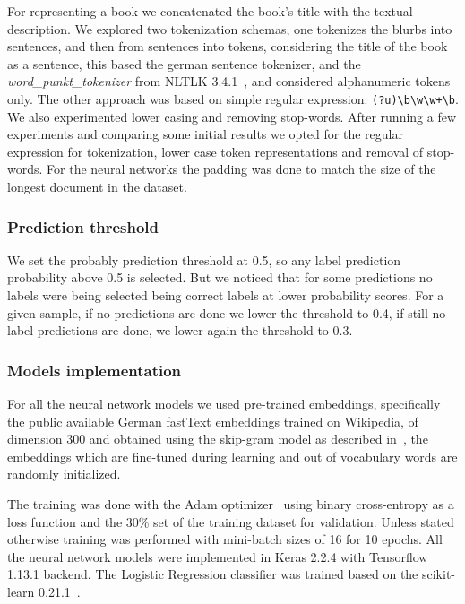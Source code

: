 \documentclass[11pt,a4paper]{article}
\begin{document}
For representing a book we concatenated the book's title with the textual
description. We explored two tokenization schemas, one tokenizes the blurbs into
sentences, and then from sentences into tokens, considering the title of the
book as a sentence, this based the german sentence tokenizer, and the
\textit{word\_punkt\_tokenizer} from NLTLK 3.4.1~\cite{Bird:2009:NLP:1717171},
and considered alphanumeric tokens only. The other approach was based on
simple regular expression: \verb|(?u)\b\w\w+\b|. We also experimented lower casing
and removing stop-words. After running a few experiments and comparing some
initial results we opted for the regular expression for tokenization, lower case
token representations and removal of stop-words. For the neural networks the
padding was done to match the size of the longest document in the dataset.


\subsubsection{Prediction threshold}

We set the probably prediction threshold at 0.5, so any label prediction probability
above 0.5 is selected. But we noticed that for some predictions no labels were
being selected being correct labels at lower probability scores. For a given
sample, if no predictions are done we lower the threshold to 0.4, if
still no label predictions are done, we lower again the threshold to 0.3.



\subsubsection{Models implementation}

For all the neural network models we used pre-trained embeddings, specifically
the public available German fastText embeddings trained on Wikipedia, of
dimension 300 and obtained using the skip-gram model as described
in~\citet{bojanowski-etal-2017-enriching}, the embeddings which are fine-tuned
during learning and out of vocabulary words are randomly initialized.

The training was done with the Adam optimizer~\cite{journals/corr/KingmaB14}
using binary cross-entropy as a loss function and the 30\% set of the training
dataset for validation. Unless stated otherwise training was performed with
mini-batch sizes of 16 for 10 epochs. All the neural network models were implemented in
Keras 2.2.4 with Tensorflow 1.13.1 backend. The Logistic Regression classifier
was trained based on the scikit-learn 0.21.1~\cite{Pedregosa:2011:SML:1953048.2078195}.
\end{document}
